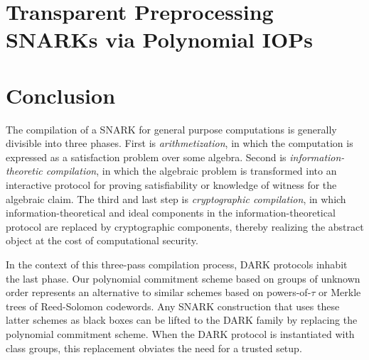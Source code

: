 \documentclass{article}
\theoremstyle{definition}
\newtheorem{corollary}{Corollary}
\newcommand{\benedikt}[1]{{\textcolor{red}{[Benedikt: #1]}}}
\newcommand{\benedikt}[1]{}
\begin{document}
\begin{comment}
 The extractor recuses with the encoding of $f(X)$ and degree $\hat{d}'=\hat{d}\cdot 2$.
 
 Repeating this $\log_2(d+1)$ times we get a polynomial $f(X)$ of degree $d$ that has coefficients that are bounded by $(d+1) \cdot p^{\log_2(d+1)+1} <q/2$. 
 


\end{proof}

\begin{corollary}
	If $q<bla$ there exists an efficient adversary that can break the evaluation binding property of the polynomial commitment.
\end{corollary}
\benedikt{Figure out at what q we can attack the scheme. Probably needs to use negative coefficients and such.}
\end{comment}


\section{Transparent Preprocessing SNARKs via Polynomial IOPs}\label{sec:polyiop}


\section{Conclusion}

The compilation of a SNARK for general purpose computations is generally divisible into three phases. First is \emph{arithmetization}, in which the computation is expressed as a satisfaction problem over some algebra. Second is \emph{information-theoretic compilation}, in which the algebraic problem is transformed into an interactive protocol for proving satisfiability or knowledge of witness for the algebraic claim. The third and last step is \emph{cryptographic compilation}, in which information-theoretical and ideal components in the information-theoretical protocol are replaced by cryptographic components, thereby realizing the abstract object at the cost of computational security. 

In the context of this three-pass compilation process, DARK protocols inhabit the last phase. Our polynomial commitment scheme based on groups of unknown order represents an alternative to similar schemes based on powers-of-$\tau$ or Merkle trees of Reed-Solomon codewords. Any SNARK construction that uses these latter schemes as black boxes can be lifted to the DARK family by replacing the polynomial commitment scheme. When the DARK protocol is instantiated with class groups, this replacement obviates the need for a trusted setup.
\end{document}

